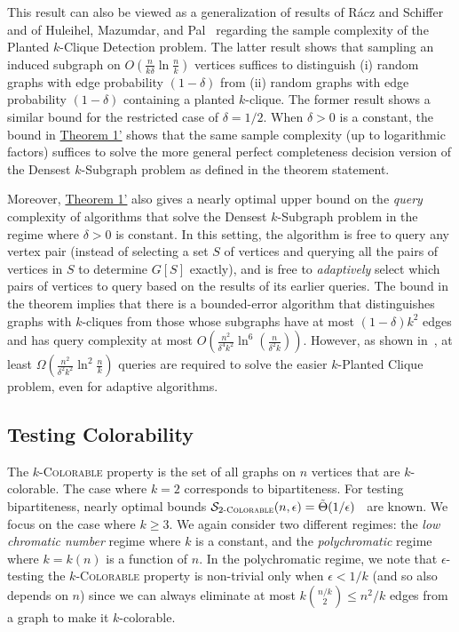 \documentclass[11pt]{article}
\begin{document}
This result can also be viewed as a generalization of results of R{\' a}cz and Schiffer~\cite{RaczSchiffer2019} and of Huleihel, Mazumdar, and Pal~\cite{HuleihelMP2021} regarding the sample complexity of the Planted $k$-Clique Detection problem. 
The latter result shows that sampling an induced subgraph on $O(\frac{n}{k\delta} \ln {\frac nk})$ vertices suffices to distinguish (i) random graphs with edge probability $(1-\delta)$ from (ii) random graphs with edge probability $(1-\delta)$ containing a planted $k$-clique.
The former result shows a similar bound for the restricted case of $\delta = 1/2.$
When $\delta>0$ is a constant, the bound in \hyperlink{thm:clique-alt}{Theorem 1'} shows that the same sample complexity (up to logarithmic factors) suffices to solve the more general perfect completeness decision version of the Densest $k$-Subgraph problem as defined in the theorem statement.

Moreover, \hyperlink{thm:clique-alt}{Theorem 1'} also gives a nearly optimal upper bound on the \emph{query} complexity of algorithms that solve the Densest $k$-Subgraph problem in the regime where $\delta > 0$ is constant.
In this setting, the algorithm is free to query any vertex pair (instead of selecting a set $S$ of vertices and querying all the pairs of vertices in $S$ to determine $G[S]$ exactly), and is free to \emph{adaptively} select which pairs of vertices to query based on the results of its earlier queries. 
The bound in the theorem implies that there is a bounded-error algorithm that distinguishes graphs with $k$-cliques from those whose subgraphs have at most $(1-\delta)k^2$ edges and has query complexity at most $O(\frac{n^2}{\delta^4 k^2}\ln^6(\frac{n}{\delta^2 k}))$. 
However, as shown in~\cite{RaczSchiffer2019,HuleihelMP2021}, at least $\Omega(\frac{n^2}{\delta^2 k^2} \ln^2 {\frac nk})$ queries are required to solve the easier $k$-Planted Clique problem, even for adaptive algorithms. 


\subsection{Testing Colorability}

The \textsc{$k$-Colorable} property is the set of all graphs on $n$ vertices that are $k$-colorable. The case where $k=2$ corresponds to bipartiteness.
For testing bipartiteness, nearly optimal bounds $\mathcal{S}_{2\textsc{-Colorable}}(n,\epsilon) = \tilde{\Theta}(1/\epsilon)$~\cite{goldreichPropertyTesting1998,AlonKrivelevich02} are known. We focus on the case where $k \ge 3$. We again consider two different regimes: the \emph{low chromatic number} regime where $k$ is a constant, and the \emph{polychromatic} regime where $k = k(n)$ is a function of $n$.
In the polychromatic regime, we note that $\epsilon$-testing the \textsc{$k$-Colorable} property is non-trivial only when $\epsilon < 1/k$ (and so also depends on $n$) since we can always eliminate at most $k \binom{n/k}{2} \le n^2/k$ edges from a graph to make it $k$-colorable.
\end{document}
